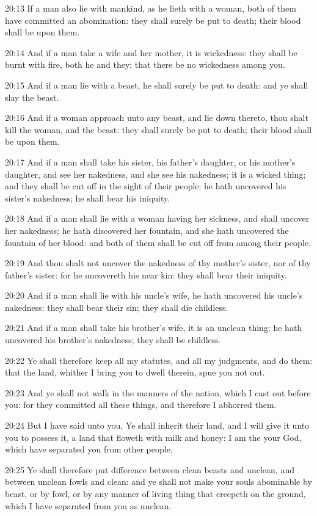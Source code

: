 20:13 If a man also lie with mankind, as he lieth with a woman, both of them have committed an abomination: they shall surely be put to death; their blood shall be upon them.

20:14 And if a man take a wife and her mother, it is wickedness: they shall be burnt with fire, both he and they; that there be no wickedness among you.

20:15 And if a man lie with a beast, he shall surely be put to death: and ye shall slay the beast.

20:16 And if a woman approach unto any beast, and lie down thereto, thou shalt kill the woman, and the beast: they shall surely be put to death; their blood shall be upon them.

20:17 And if a man shall take his sister, his father's daughter, or his mother's daughter, and see her nakedness, and she see his nakedness; it is a wicked thing; and they shall be cut off in the sight of their people: he hath uncovered his sister's nakedness; he shall bear his iniquity.

20:18 And if a man shall lie with a woman having her sickness, and shall uncover her nakedness; he hath discovered her fountain, and she hath uncovered the fountain of her blood: and both of them shall be cut off from among their people.

20:19 And thou shalt not uncover the nakedness of thy mother's sister, nor of thy father's sister: for he uncovereth his near kin: they shall bear their iniquity.

20:20 And if a man shall lie with his uncle's wife, he hath uncovered his uncle's nakedness: they shall bear their sin; they shall die childless.

20:21 And if a man shall take his brother's wife, it is an unclean thing: he hath uncovered his brother's nakedness; they shall be childless.

20:22 Ye shall therefore keep all my statutes, and all my judgments, and do them: that the land, whither I bring you to dwell therein, spue you not out.

20:23 And ye shall not walk in the manners of the nation, which I cast out before you: for they committed all these things, and therefore I abhorred them.

20:24 But I have said unto you, Ye shall inherit their land, and I will give it unto you to possess it, a land that floweth with milk and honey: I am the \LORD your God, which have separated you from other people.

20:25 Ye shall therefore put difference between clean beasts and unclean, and between unclean fowls and clean: and ye shall not make your souls abominable by beast, or by fowl, or by any manner of living thing that creepeth on the ground, which I have separated from you as unclean.

